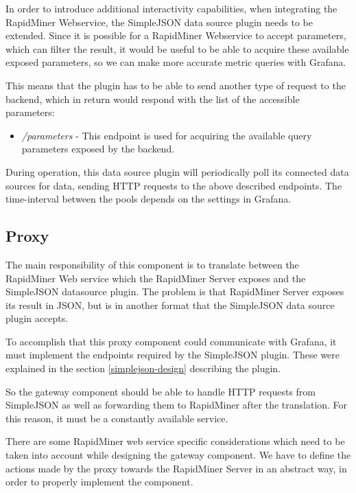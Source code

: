 In order to introduce additional interactivity capabilities, when integrating the RapidMiner Webservice, the SimpleJSON data source plugin needs to be extended. Since it is possible for a RapidMiner Webservice to accept parameters, which can filter the result, it would be useful to be able to acquire these available exposed parameters, so we can make more accurate metric queries with Grafana.

This means that the plugin has to be able to send another type of request to the backend, which in return would respond with the list of the accessible parameters:

\begin{itemize}
	\item \emph{/parameters} - This endpoint is used for acquiring the available query parameters exposed by the backend.
\end{itemize}

During operation, this data source plugin will periodically poll its connected data sources for data, sending HTTP requests to the above described endpoints. The time-interval between the pools depends on the settings in Grafana.

\subsection{Proxy} \label{proxy-design}

The main responsibility of this component is to translate between the RapidMiner Web service which the RapidMiner Server exposes and the SimpleJSON datasource plugin. The problem is that RapidMiner Server exposes its result in JSON, but is in another format that the SimpleJSON data source plugin accepts.

To accomplish that this proxy component could communicate with Grafana, it must implement the endpoints required by the SimpleJSON plugin. These were explained in the section \ref{simplejson-design} describing the plugin.

So the gateway component should be able to handle HTTP requests from SimpleJSON as well as forwarding them to RapidMiner after the translation. For this reason, it must be a constantly available service.

There are some RapidMiner web service specific considerations which need to be taken into account while designing the gateway component. We have to define the actions made by the proxy towards the RapidMiner Server in an abstract way, in order to properly implement the component.

